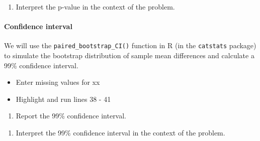 \documentclass[
]{report}
\newenvironment{Shaded}{\begin{snugshade}}{\end{snugshade}}
\newcommand{\AttributeTok}[1]{\textcolor[rgb]{0.13,0.29,0.53}{#1}}
\newcommand{\CommentTok}[1]{\textcolor[rgb]{0.56,0.35,0.01}{\textit{#1}}}
\newcommand{\DecValTok}[1]{\textcolor[rgb]{0.00,0.00,0.81}{#1}}
\newcommand{\FunctionTok}[1]{\textcolor[rgb]{0.13,0.29,0.53}{\textbf{#1}}}
\newcommand{\NormalTok}[1]{#1}
\newcommand{\SpecialCharTok}[1]{\textcolor[rgb]{0.81,0.36,0.00}{\textbf{#1}}}
\providecommand{\tightlist}{%
  \setlength{\itemsep}{0pt}\setlength{\parskip}{0pt}}
\begin{document}
\begin{enumerate}
\def\labelenumi{\arabic{enumi}.}
\setcounter{enumi}{6}
\tightlist
\item
  Interpret the p-value in the context of the problem.
  \vspace{1in}
\end{enumerate}

\paragraph*{Confidence interval}\label{confidence-interval-4}

We will use the \texttt{paired\_bootstrap\_CI()} function in R (in the \texttt{catstats} package) to simulate the bootstrap distribution of sample mean differences and calculate a 99\% confidence interval.

\begin{itemize}
\item
  Enter missing values for xx
\item
  Highlight and run lines 38 - 41
\end{itemize}

\begin{Shaded}
\end{Shaded}

\begin{enumerate}
\def\labelenumi{\arabic{enumi}.}
\setcounter{enumi}{7}
\tightlist
\item
  Report the 99\% confidence interval.
\end{enumerate}

\vspace{0.2in}

\begin{enumerate}
\def\labelenumi{\arabic{enumi}.}
\setcounter{enumi}{8}
\tightlist
\item
  Interpret the 99\% confidence interval in the context of the problem.
\end{enumerate}
\end{document}
